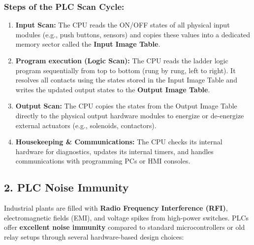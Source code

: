 \subsubsection{Steps of the PLC Scan Cycle:}
\begin{enumerate}
  \item \textbf{Input Scan:} The CPU reads the ON/OFF states of all physical input modules (e.g., push buttons, sensors) and copies these values into a dedicated memory sector called the \textbf{Input Image Table}.
  \item \textbf{Program execution (Logic Scan):} The CPU reads the ladder logic program sequentially from top to bottom (rung by rung, left to right). It resolves all contacts using the states stored in the Input Image Table and writes the updated output states to the \textbf{Output Image Table}.
  \item \textbf{Output Scan:} The CPU copies the states from the Output Image Table directly to the physical output hardware modules to energize or de-energize external actuators (e.g., solenoids, contactors).
  \item \textbf{Housekeeping \& Communications:} The CPU checks its internal hardware for diagnostics, updates its internal timers, and handles communications with programming PCs or HMI consoles.
\end{enumerate}


\subsection{2. PLC Noise Immunity}
Industrial plants are filled with \textbf{Radio Frequency Interference (RFI)}, electromagnetic fields (EMI), and voltage spikes from high-power switches. PLCs offer \textbf{excellent noise immunity} compared to standard microcontrollers or old relay setups through several hardware-based design choices:

